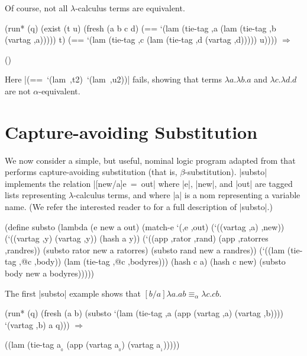 Of course, not all $\lambda$-calculus terms are equivalent.

\schemedisplayspace
\begin{schemedisplay}
(run* (q)
  (exist (t u)
    (fresh (a b c d)
      (== `(lam (tie-tag ,a (lam (tie-tag ,b (vartag ,a))))) t)
      (== `(lam (tie-tag ,c (lam (tie-tag ,d (vartag ,d))))) u)))) $\Rightarrow$
\end{schemedisplay}
\nspace
\begin{schemeresponse}
()
\end{schemeresponse}

\noindent Here \mbox{\scheme|(== `(lam ,t2) `(lam ,u2))|} fails, 
showing that terms $\lambda a . \lambda b . a$ and $\lambda c . \lambda d . d$ 
are not $\alpha$-equivalent.

\section{Capture-avoiding Substitution}\label{aksubst}
We now consider a simple, but useful, nominal logic program 
adapted from \citet{CheneyU04} that performs capture-avoiding
substitution (that is, $\beta$-substitution).
\scheme|substo| implements the relation \mbox{\scheme|[new/a]e = out|}
where \scheme|e|, \scheme|new|, and \scheme|out|
are tagged lists representing $\lambda$-calculus terms, and
where \scheme|a| is a nom representing a variable name.
(We refer the interested reader to \citeauthor{CheneyU04}
for a full description of \scheme|substo|.)

\schemedisplayspace
\begin{schemedisplay}
(define substo  
  (lambda (e new a out)
    (match-e `(,e ,out)
      (`((vartag ,a) ,new))
      (`((vartag ,y) (vartag ,y))
       (hash a y))
      (`((app ,rator ,rand) (app ,ratorres ,randres))
       (substo rator new a ratorres)
       (substo rand new a randres))
      (`((lam (tie-tag ,@c ,body)) (lam (tie-tag ,@c ,bodyres)))
       (hash c a)
       (hash c new)
       (substo body new a bodyres)))))
\end{schemedisplay}

The first \scheme|substo| example shows that
$[b/a]\lambda a.ab \equiv _{\alpha} \lambda c.cb$.

\schemedisplayspace
\begin{schemedisplay}
(run* (q)
  (fresh (a b)
    (substo `(lam (tie-tag ,a (app (vartag ,a) (vartag ,b)))) `(vartag ,b) a q))) $\Rightarrow$
\end{schemedisplay}
\nspace
\begin{schemeresponse}
((lam (tie-tag a$_{_{0}}$ (app (vartag a$_{_{0}}$) (vartag a$_{_{1}}$)))))
\end{schemeresponse}

